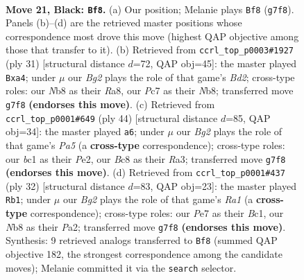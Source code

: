 \documentclass[11pt]{article}
\begin{document}
\clearpage

\begin{figure}[p]\centering
\begin{subfigure}{0.46\textwidth}\centering
\resizebox{\linewidth}{!}{%
\newchessgame
\chessboard[
  setfen={rnb1r2k/ppp1p1b1/5nR1/P1P5/8/1B3N2/1P3P2/RNB1K3 b Q - 0 21},
  showmover=false,
  pgfstyle=straightmove, color=movearrow, markmove={g7-f8}
]}
\caption{}
\end{subfigure}\hfill
\begin{subfigure}{0.46\textwidth}\centering
\resizebox{\linewidth}{!}{%
\newchessgame
\chessboard[
  setfen={rn2k2r/1p1b1ppp/3Rp3/p7/P3PP2/1NP5/2P3PP/1K3B1R b kq - 0 16},
  showmover=false,
  pgfstyle=straightmove, color=movearrow, markmove={d7-a4}
]}
\caption{}
\end{subfigure}
\\[4pt]
\begin{subfigure}{0.46\textwidth}\centering
\resizebox{\linewidth}{!}{%
\newchessgame
\chessboard[
  setfen={3r2k1/p4ppp/2p5/PrN1b3/8/R3BPPb/4P2P/4R1K1 w - - 2 23},
  showmover=false,
  pgfstyle=straightmove, color=movearrow, markmove={a5-a6}
]}
\caption{}
\end{subfigure}\hfill
\begin{subfigure}{0.46\textwidth}\centering
\resizebox{\linewidth}{!}{%
\newchessgame
\chessboard[
  setfen={r5nr/3k1ppp/p7/N2pP3/1P1b2b1/8/P2N1PPP/R1B1K2R w KQ - 3 17},
  showmover=false,
  pgfstyle=straightmove, color=movearrow, markmove={a1-b1}
]}
\caption{}
\end{subfigure}
\caption{\textbf{Move 21, Black: \texttt{Bf8}.} (a) Our position; Melanie plays \texttt{Bf8} (\texttt{g7f8}). Panels (b)--(d) are the retrieved master positions whose correspondence most drove this move (highest QAP objective among those that transfer to it). (b) Retrieved from \texttt{ccrl\_top\_p0003\#1927} (ply 31) [structural distance $d$=72, QAP obj=45]: the master played \texttt{Bxa4}; under $\mu$ our \emph{Bg2} plays the role of that game's \emph{Bd2}; cross-type roles: our \emph{N}b8 as their \emph{R}a8, our \emph{P}c7 as their \emph{N}b8; transferred move \texttt{g7f8} \textbf{(endorses this move)}. (c) Retrieved from \texttt{ccrl\_top\_p0001\#649} (ply 44) [structural distance $d$=85, QAP obj=34]: the master played \texttt{a6}; under $\mu$ our \emph{Bg2} plays the role of that game's \emph{Pa5} (a \textbf{cross-type} correspondence); cross-type roles: our \emph{b}c1 as their \emph{P}e2, our \emph{B}c8 as their \emph{R}a3; transferred move \texttt{g7f8} \textbf{(endorses this move)}. (d) Retrieved from \texttt{ccrl\_top\_p0001\#437} (ply 32) [structural distance $d$=83, QAP obj=23]: the master played \texttt{Rb1}; under $\mu$ our \emph{Bg2} plays the role of that game's \emph{Ra1} (a \textbf{cross-type} correspondence); cross-type roles: our \emph{P}e7 as their \emph{B}c1, our \emph{N}b8 as their \emph{P}a2; transferred move \texttt{g7f8} \textbf{(endorses this move)}. Synthesis: 9 retrieved analogs transferred to \texttt{Bf8} (summed QAP objective 182, the strongest correspondence among the candidate moves); Melanie committed it via the \texttt{search} selector.}
\label{fig:thought-m41}
\end{figure}
\end{document}
